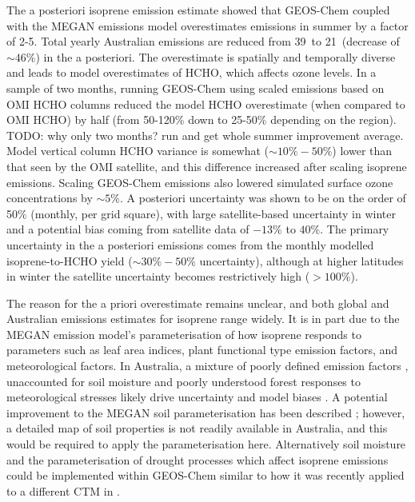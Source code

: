   The a posteriori isoprene emission estimate showed that GEOS-Chem coupled with the MEGAN emissions model overestimates emissions in summer by a factor of 2-5.
  Total yearly Australian emissions are reduced from 39\tgpyr ~to 21\tgpyr ~(decrease of $\sim{46}\%$) in the a posteriori.
  The overestimate is spatially and temporally diverse and leads to model overestimates of HCHO, which affects ozone levels.
  In a sample of two months, running GEOS-Chem using scaled emissions based on OMI HCHO columns reduced the model HCHO overestimate (when compared to OMI HCHO) by half (from 50-120\% down to 25-50\% depending on the region).
  TODO: why only two months? run and get whole summer improvement average.
  Model vertical column HCHO variance is somewhat ($\sim{10\%-50\%}$) lower than that seen by the OMI satellite, and this difference increased after scaling isoprene emissions.
  Scaling GEOS-Chem emissions also lowered simulated surface ozone concentrations by $\sim 5\%$.
  A posteriori uncertainty was shown to be on the order of 50\%  (monthly, per grid square), with large satellite-based uncertainty in winter and a potential bias coming from satellite data of $-13\%$ to $40\%$.
  The primary uncertainty in the a posteriori emissions comes from the monthly modelled isoprene-to-HCHO yield ($\sim 30\%-50\%$ uncertainty), although at higher latitudes in winter the satellite uncertainty becomes restrictively high ($>100\%$).
  
  
  
  The reason for the a priori overestimate remains unclear, and both global and Australian emissions estimates for isoprene range widely.
  It is in part due to the MEGAN emission model's parameterisation of how isoprene responds to parameters such as leaf area indices, plant functional type emission factors, and meteorological factors. 
  In Australia, a mixture of poorly defined emission factors \parencite[e.g.,][]{Emmerson2016}, unaccounted for soil moisture \parencite[e.g.,][]{Sindelarova2014, Emmerson2019} and poorly understood forest responses to meteorological stresses likely drive uncertainty and model biases \parencite{Jiang2018,Emmerson2019}.
  A potential improvement to the MEGAN soil parameterisation has been described \parencite{Jiang2018}; however, a detailed map of soil properties is not readily available in Australia, and this would be required to apply the parameterisation here.
  Alternatively soil moisture and the parameterisation of drought processes which affect isoprene emissions could be implemented within GEOS-Chem similar to how it was recently applied to a different CTM in \textcite{Emmerson2019}. 


